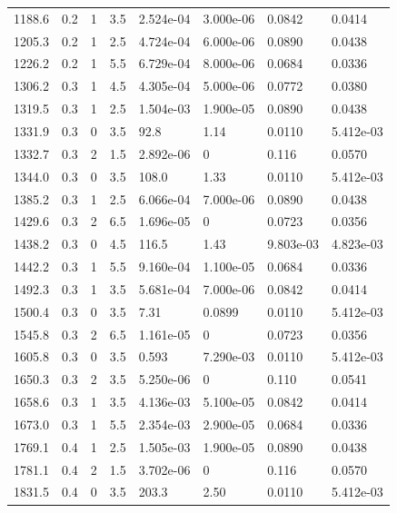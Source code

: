 \documentclass[preview]{standalone}
\begin{document}
{{{\begin{tabular}{L{1.2cm}C{1.2cm} C{0.3cm}C{0.5cm} C{1.4cm}C{1.4cm} C{1.4cm}C{1.4cm}}
  1188.6  &   0.2  & 1     & 3.5 &  2.524e-04  & 3.000e-06  & 0.0842 &  0.0414   \\ 
  1205.3  &   0.2  & 1     & 2.5 &  4.724e-04  & 6.000e-06  & 0.0890 &  0.0438   \\ 
  1226.2  &   0.2  & 1     & 5.5 &  6.729e-04  & 8.000e-06  & 0.0684 &  0.0336   \\ 
  1306.2  &   0.3  & 1     & 4.5 &  4.305e-04  & 5.000e-06  & 0.0772 &  0.0380   \\ 
  1319.5  &   0.3  & 1     & 2.5 &  1.504e-03  & 1.900e-05  & 0.0890 &  0.0438   \\ 
  1331.9  &   0.3  & 0     & 3.5 &  92.8  & 1.14  & 0.0110 &  5.412e-03   \\ 
  1332.7  &   0.3  & 2     & 1.5 &  2.892e-06  & 0  & 0.116 &  0.0570   \\ 
  1344.0  &   0.3  & 0     & 3.5 &  108.0  & 1.33  & 0.0110 &  5.412e-03   \\ 
  1385.2  &   0.3  & 1     & 2.5 &  6.066e-04  & 7.000e-06  & 0.0890 &  0.0438   \\ 
  1429.6  &   0.3  & 2     & 6.5 &  1.696e-05  & 0  & 0.0723 &  0.0356   \\ 
  1438.2  &   0.3  & 0     & 4.5 &  116.5  & 1.43  & 9.803e-03 &  4.823e-03   \\ 
  1442.2  &   0.3  & 1     & 5.5 &  9.160e-04  & 1.100e-05  & 0.0684 &  0.0336   \\ 
  1492.3  &   0.3  & 1     & 3.5 &  5.681e-04  & 7.000e-06  & 0.0842 &  0.0414   \\ 
  1500.4  &   0.3  & 0     & 3.5 &  7.31  & 0.0899  & 0.0110 &  5.412e-03   \\ 
  1545.8  &   0.3  & 2     & 6.5 &  1.161e-05  & 0  & 0.0723 &  0.0356   \\ 
  1605.8  &   0.3  & 0     & 3.5 &  0.593  & 7.290e-03  & 0.0110 &  5.412e-03   \\ 
  1650.3  &   0.3  & 2     & 3.5 &  5.250e-06  & 0  & 0.110 &  0.0541   \\ 
  1658.6  &   0.3  & 1     & 3.5 &  4.136e-03  & 5.100e-05  & 0.0842 &  0.0414   \\ 
  1673.0  &   0.3  & 1     & 5.5 &  2.354e-03  & 2.900e-05  & 0.0684 &  0.0336   \\ 
  1769.1  &   0.4  & 1     & 2.5 &  1.505e-03  & 1.900e-05  & 0.0890 &  0.0438   \\ 
  1781.1  &   0.4  & 2     & 1.5 &  3.702e-06  & 0  & 0.116 &  0.0570   \\ 
  1831.5  &   0.4  & 0     & 3.5 &  203.3  & 2.50  & 0.0110 &  5.412e-03   \\ 

\end{tabular}}}}
\end{document}
